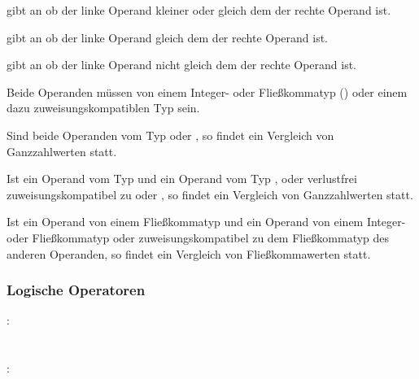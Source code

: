 \op{<=} gibt an ob der linke Operand kleiner oder gleich dem der rechte Operand ist.

\op{==} gibt an ob der linke Operand gleich dem der rechte Operand ist.

\op{!=} gibt an ob der linke Operand nicht gleich dem der rechte Operand ist.

Beide Operanden müssen von einem Integer- oder Fließkommatyp () oder einem
dazu zuweisungskompatiblen Typ sein.

Sind beide Operanden vom Typ  oder , so findet ein Vergleich von Ganzzahlwerten statt.

Ist ein Operand vom Typ  und ein Operand vom Typ ,  oder
verlustfrei zuweisungskompatibel zu  oder , so findet ein Vergleich von Ganzzahlwerten statt.

Ist ein Operand von einem Fließkommatyp und ein Operand von einem Integer- oder Fließkommatyp
oder zuweisungskompatibel zu dem Fließkommatyp des anderen Operanden,
so findet ein Vergleich von Fließkommawerten statt.


\subsubsection{Logische Operatoren}\label{Logische Operatoren}
:\label{asdr_logisch_oder}\\
\hspace*{1cm} \\
\hspace*{1cm} \glq\Gt{||}\grq  {} \\
:\label{asdr_logisch_und}\\
\hspace*{1cm} \\
\hspace*{1cm} \glq\Gt{\&\&}\grq  {} \\


